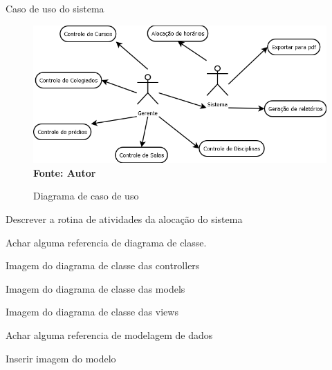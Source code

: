 	Caso de uso do sistema\par\cite{alterar}

	\begin{figure}[!htb]
		\centering
   		\caption[Diagrama de caso de uso]{Diagrama de caso de uso}
   		\label{fig:figura2}
   		\centering
   		\includegraphics[scale=0.5]{diagramaCasoUso.png}
   		\\ \textbf{\footnotesize Fonte: Autor}
	\end{figure}


	
	Descrever a rotina de atividades da alocação do sistema
	

		
	Achar alguma referencia de diagrama de classe.

	Imagem do diagrama de classe das controllers

	
	Imagem do diagrama de classe das models

	
	Imagem do diagrama de classe das views


	Achar alguma referencia de modelagem de dados

	Inserir imagem do modelo

